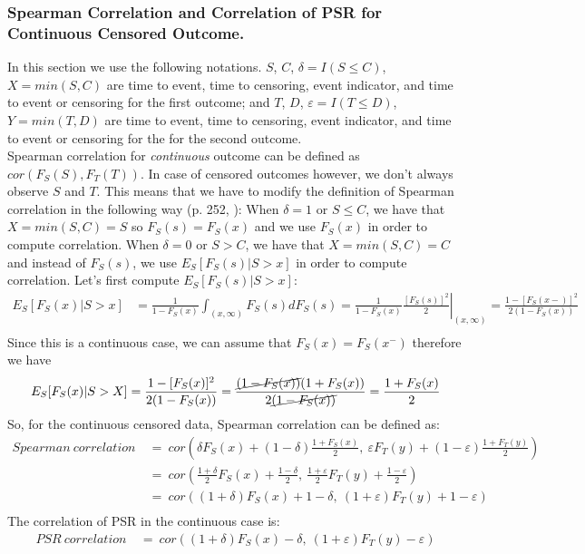 \documentclass[]{article}
\let\epsilon\varepsilon
\begin{document}
\subsubsection{Spearman Correlation and Correlation of PSR for Continuous Censored Outcome.}
In this section we use the following notations. $S$, $C$, $\delta=I(S\leq C)$, $X = min(S, C)$ are time to event, time to censoring, event indicator, and time to event or censoring for the first outcome; and $T$, $D$, $\epsilon=I(T\leq D)$, $Y = min(T, D)$ are time to event, time to censoring, event indicator, and time to event or censoring for the for the second outcome.\\
Spearman correlation for \emph{continuous} outcome can be defined as $cor(F_S(S), F_T(T))$. In case of censored outcomes however, we don't always observe $S$ and $T$. This means that we have to modify the definition of Spearman correlation in the following way (p. 252, \cite{dabrowska1986rank}): When $\delta = 1$ or $S\leq C$, we have that $X = min(S, C)=S$ so $F_S(s)=F_S(x)$ and we use $F_S(x)$ in order to compute correlation. When $\delta = 0$ or $S > C$, we have that $X = min(S, C)=C$ and instead of $F_S(s)$, we use $E_S[F_S(s)|S>x]$ in order to compute correlation. Let's first compute $E_S[F_S(s)|S>x]$:
	$$
	\begin{aligned}
		E_S[F_S(x)|S>x] &= \frac{1}{1-F_S(x)}\int_{(x, \infty)} F_S(s)dF_S(s) = \frac{1}{1-F_S(x)} \left.\frac{ [F_S(s)]^2}{2}\right|_{(x, \infty)} = \frac{1-[F_S(x-)]^2}{2(1-F_S(x))} \\
	\end{aligned}
	$$
Since this is a continuous case, we can assume that $F_S(x)=F_S(x^-)$ therefore we have
	$$
	\begin{aligned}
		E_S[F_S(x)|S>X] &=\frac{1-[F_S(x)]^2}{2(1-F_S(x))}=\frac{\cancel{(1-F_S(x))}(1+F_S(x))}{2\cancel{(1-F_S(x))}}  = \frac{1+F_S(x)}{2} \\
	\end{aligned}
	$$
So, for the continuous censored data, Spearman correlation can be defined as:
	$$
	\begin{aligned}
		Spearman~correlation~&=~ cor\left(  \delta F_S(x) + (1-\delta) \frac{1+F_S(x)}{2},~\epsilon F_T(y) + (1-\epsilon) \frac{1+F_T(y)}{2}  \right)\\
		&=~ cor\left(  \frac{1+\delta}{2}F_S(x) +  \frac{1-\delta}{2},~\frac{1+\epsilon}{2}F_T(y) +  \frac{1-\epsilon}{2}  \right)\\
		&=~ cor\left(  (1+\delta)F_S(x) +  1-\delta,~(1+\epsilon)F_T(y) +  1-\epsilon  \right)\\
	\end{aligned}
	$$
The correlation of PSR in the continuous case is:
	$$
	\begin{aligned}
		PSR~correlation~&=~ cor\left(  (1+\delta)F_S(x) -\delta,~(1+\epsilon)F_T(y) -\epsilon  \right)\\
	\end{aligned}
	$$
\end{document}
